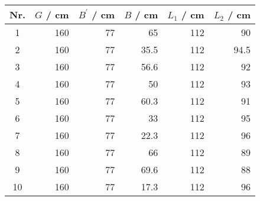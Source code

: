 \begin{tabular}{c|rrrrr}
Nr. & $G$ / cm & $B^\prime$ / cm & $B$ / cm & $L_1$ / cm & $L_2$ / cm \\
\hline
1 & 160 & 77 & 65 & 112 & 90\\
2 & 160 & 77 & 35.5 & 112 & 94.5\\
3 & 160 & 77 & 56.6 & 112 & 92\\
4 & 160 & 77 & 50 & 112 & 93\\
5 & 160 & 77 & 60.3 & 112 & 91\\
6 & 160 & 77 & 33 & 112 & 95\\
7 & 160 & 77 & 22.3 & 112 & 96\\
8 & 160 & 77 & 66 & 112 & 89\\
9 & 160 & 77 & 69.6 & 112 & 88\\
10 & 160 & 77 & 17.3 & 112 & 96
\end{tabular}
